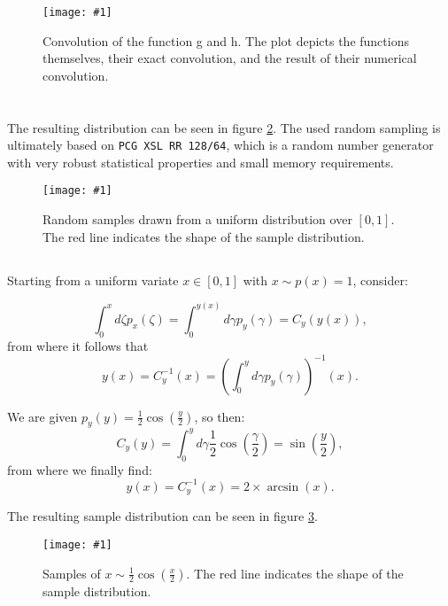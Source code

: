 \documentclass[10pt, a4paper]{article}
\newcommand{\plot}[3]{\begin{figure}[ht]\centering\texttt{[image: \#1]}\caption{#2}\label{#3}\end{figure}}
\begin{document}
  \plot{assignment-q-4}{
    Convolution of the function g and h. The plot depicts the functions themselves, their exact
    convolution, and the result of their numerical convolution.
  }{fig:conv}

\section{}
  \subsection{}
  The resulting distribution can be seen in figure \ref{fig:uniform}. The used random sampling
  is ultimately based on \texttt{PCG XSL RR 128/64}, which is a random number generator with
  very robust statistical properties and small memory requirements\cite{pcg}.

  \plot{assignment-q-5-a}{
    Random samples drawn from a uniform distribution over $[0,1]$. The red line indicates the shape of
    the sample distribution.
  }{fig:uniform}

  \subsection{}
  \label{sec:sample}
  Starting from a uniform variate $x \in [0,1]$ with $x \sim p(x) = 1$, consider:

  \begin{equation}
    \int_0^x d\zeta p_x(\zeta) = \int_0^{y(x)} d\gamma p_y(\gamma) = C_y(y(x)),
  \end{equation}
  from where it follows that
  \begin{equation}
    y(x) = C_y^{-1}(x) = \left(\int_0^y d\gamma p_y(\gamma)\right)^{-1}(x).
  \end{equation}

  We are given $p_y(y) = \frac{1}{2} \cos(\frac{y}{2})$, so then:
  \begin{equation}
    C_y(y) = \int_0^y d\gamma \frac{1}{2} \cos(\frac{\gamma}{2}) = \sin(\frac{y}{2}),
  \end{equation}
  from where we finally find:
  \begin{equation}
    y(x) = C_y^{-1}(x) = 2 \times \arcsin(x).
  \end{equation}

  The resulting sample distribution can be seen in figure \ref{fig:sample}.

  \plot{assignment-q-5-b}{
    Samples of $x \sim \frac{1}{2} \cos(\frac{x}{2})$. The red line indicates the shape of
    the sample distribution.
  }{fig:sample}
\end{document}
